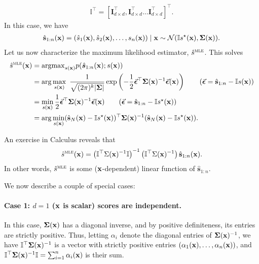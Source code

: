 \begin{align}
    \mathbb{I}^\top= [\mathbf{I}_{d\times d}^\top,\mathbf{I}^\top_{d\times d} \dots \mathbf{I}^\top_{d\times d}]^\top.
\end{align}
In this case, we have
\begin{align}
\hat{\mathbf{s}}_{1:n}({\mathbf{x}}) = (\hat s_1({\mathbf{x}}), \hat s_2({\mathbf{x}}),\dots, s_n({\mathbf{x}})) \mid {\mathbf{x}} \sim \mathcal{N}(\mathbb I s^\star({\mathbf{x}}), \bm \Sigma({\mathbf{x}})).
\end{align}
Let us now characterize the maximum likelihood estimator, $\hat s^{\textsc{mle}}$. This solves
\begin{align*}
    \smle(\bx) &= \argmax_{s(\bx)} p(\hat{\bm{s}}_{1:n}(\bx); s(\bx))\\
    &=\arg\max_{s(\bx)} \ \frac{1}{\sqrt{(2\pi)^k |\boldsymbol{\Sigma}|}} \exp\left(-\frac{1}{2} \veceps^\top \bSigma(\bx)^{-1} \veceps(\bx)\right) \tag{$\veceps = \hat{\mathbf{s}}_{1:n} - \mathbb I s(\bx)$}\\
    &=\min_{s(\bx)}   \frac{1}{2} \veceps^\top \bSigma(\bx)^{-1} \veceps(\bx)  \tag{$\veceps = \hat{\mathbf{s}}_{1:n} - \mathbb I s^\star(\bx)$}\\
&= \arg\min_{s(\bx)}  (\hat{\mathbf s}_N(\bx)-\mathbb{I} s^\star(\bx))^\top \bm\Sigma(\bx)^{-1} (\hat{\mathbf s}_N(\bx)-\mathbb{I} s^\star(\bx)).
\end{align*}
\newcommand{\shatonen}{\hat{\mathbf{s}}_{1:n}}

An exercise in Calculus reveals that 
\begin{align}
    \hat s^{\textsc{mle}}({\mathbf{x}}) = \bm \left(\mathbb I^\top \Sigma({\mathbf{x}})^{-1} \mathbb{I}\right)^{-1}\left(\mathbb I^\top \Sigma({\mathbf{x}})^{-1}\right) \hat{\mathbf s}_{1:n}({\mathbf{x}}).
\end{align}
In other words, $\hat s^{\textsc{mle}}$ is some (${\mathbf{x}}$-dependent) linear function of $\shatonen$. 

We now describe a couple of special cases:

\paragraph{Case 1: $d =1$ (${\mathbf{x}}$ is scalar) scores are independent.} In this case, $\bm{\Sigma}({\mathbf{x}})$ has a diagonal inverse, and by positive definiteness, its entries are strictly positive. Thus, letting $\alpha_i$ denote the diagonal entries of $\bm{\Sigma}({\mathbf{x}})^{-1}$, we have $\mathbb{I}^\top\bm{\Sigma}({\mathbf{x}})^{-1}$ is a vector with strictly positive entries  $(\alpha_1({\mathbf{x}}),\dots,\alpha_n({\mathbf{x}}))$, and $\mathbb{I}^\top\bm{\Sigma}({\mathbf{x}})^{-1} \mathbb{I} = \sum_{i=1}^n \alpha_i({\mathbf{x}})$ is their sum. 

